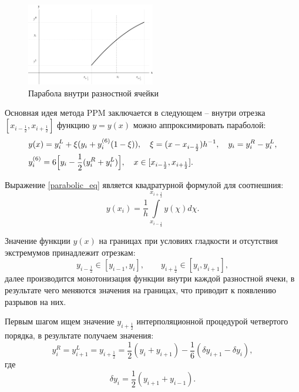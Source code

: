 \documentclass[12pt,a4paper]{article}
\newcommand{\half}{\frac{1}{2}}
\newcommand{\dhalf}{\dfrac{1}{2}}
\begin{document}
    \begin{figure}[h]
        \centering
        \includegraphics[width=0.5\textwidth]{ppm_visual.pdf}
        \caption{Парабола внутри разностной ячейки}
        \label{fig:ppm_visual}
    \end{figure}

    Основная идея метода PPM заключается в следующем -- внутри отрезка $ [x_{i-\half}, x_{i+\half}] $ функцию $ y = y(x) $ можно аппроксимировать параболой:
    \begin{equation}
    \begin{split}
        \label{parabolic_eq}
        &y(x) = y_i^L + \xi(\Delta y_i + y_i^{(6)}(1 - \xi)), \quad \xi = (x - x_{i-\half})h^{-1}, \quad  \Delta y_i = y_i^R-y_i^L, \\
        &y_i^{(6)} = 6\Bigl[ y_i - \half(y_i^R + y_i^L)\Bigr], \quad x \in [x_{i-\half}, x_{i + \half}].
    \end{split}
    \end{equation}

    Выражение \eqref{parabolic_eq} является квадратурной формулой для соотнешния:
    \[
        y(x_i) = \dfrac{1}{h} \displaystyle \int\limits_{x_{i-\half}}^{x_{i+\half}} y(\chi) d\chi.
    \]

   Значение функции $ y(x) $ на границах при условиях гладкости и отсутствия экстремумов принадлежит отрезкам:
   \begin{equation}
        \label{ppm_boundary}
        y_{i-\half} \in [y_{i-1}, y_i], \qquad y_{i+\half} \in [y_i, y_{i+1}], 
   \end{equation}
   \noindent далее производится монотонизация функции внутри каждой разностной ячеки, в результате чего меняются значения на границах, что приводит к появлению разрывов на них.

   Первым шагом ищем значение $y_{i+\half}$ интерполяционной процедурой четвертого порядка, в результате получаем значения:
   \[
        y_i^R = y_{i+1}^L = y_{i+\half} = \dhalf(y_i + y_{i+1}) - \dfrac{1}{6}(\delta y_{i+1} - \delta y_i),
   \] 
   \noindent где 
   \[
        \delta y_i = \dhalf(y_{i+1} + y_{i-1}).
   \]
\end{document}
